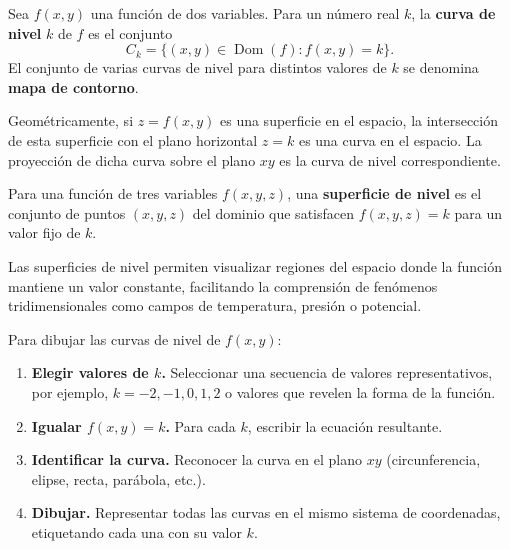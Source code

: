 \begin{definition}
Sea $f(x,y)$ una función de dos variables. Para un número real $k$, la
\textbf{curva de nivel} $k$ de $f$ es el conjunto
\[
C_k = \{(x,y) \in \operatorname{Dom}(f) : f(x,y) = k\}.
\]
El conjunto de varias curvas de nivel para distintos valores de $k$ se
denomina \textbf{mapa de contorno}.
\end{definition}

Geométricamente, si $z = f(x,y)$ es una superficie en el espacio, la
intersección de esta superficie con el plano horizontal $z = k$ es una
curva en el espacio. La proyección de dicha curva sobre el plano $xy$
es la curva de nivel correspondiente.

\begin{definition}
Para una función de tres variables $f(x,y,z)$, una \textbf{superficie
de nivel} es el conjunto de puntos $(x,y,z)$ del dominio que satisfacen
$f(x,y,z) = k$ para un valor fijo de $k$.
\end{definition}

Las superficies de nivel permiten visualizar regiones del espacio donde
la función mantiene un valor constante, facilitando la comprensión de
fenómenos tridimensionales como campos de temperatura, presión o
potencial.

\begin{pasos}
Para dibujar las curvas de nivel de $f(x,y)$:
\begin{enumerate}
  \item \textbf{Elegir valores de $k$.} Seleccionar una secuencia de
        valores representativos, por ejemplo, $k = -2, -1, 0, 1, 2$ o
        valores que revelen la forma de la función.
  \item \textbf{Igualar $f(x,y) = k$.} Para cada $k$, escribir la
        ecuación resultante.
  \item \textbf{Identificar la curva.} Reconocer la curva en el plano
        $xy$ (circunferencia, elipse, recta, parábola, etc.).
  \item \textbf{Dibujar.} Representar todas las curvas en el mismo
        sistema de coordenadas, etiquetando cada una con su valor $k$.
\end{enumerate}
\end{pasos}

